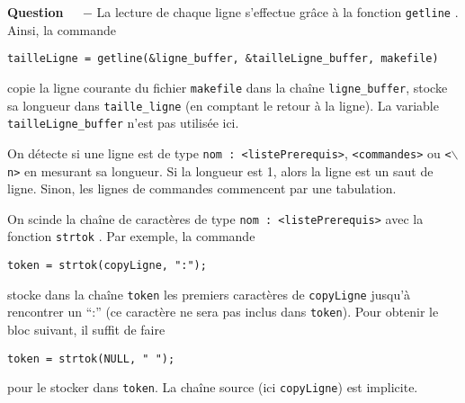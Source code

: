 \documentclass[11pt]{article}
\newcounter{question}[section]
\newenvironment{question}[1][]{\refstepcounter{question}\par\medskip
   \noindent\textbf{Question~\thequestion ~ $-$} \rmfamily}{}
\begin{document}
\begin{question}
La lecture de chaque ligne s'effectue grâce à la fonction \texttt{getline} \cite{getline}. Ainsi, la commande \begin{center}
\texttt{tailleLigne = getline(\&ligne\_buffer, \&tailleLigne\_buffer, makefile)}
\end{center}
copie la ligne courante du fichier \texttt{makefile} dans la chaîne \texttt{ligne\_buffer}, stocke sa longueur dans \texttt{taille\_ligne} (en comptant le retour à la ligne). La variable \texttt{tailleLigne\_buffer} n'est pas utilisée ici.


On détecte si une ligne est de type \texttt{nom : <listePrerequis>}, \texttt{<commandes>} ou \texttt{<$\backslash\!\!$ n>} en mesurant sa longueur. Si la longueur est 1, alors la ligne est un saut de ligne. Sinon, les lignes de commandes commencent par une tabulation.

On scinde la chaîne de caractères de type \texttt{nom : <listePrerequis>} avec la fonction \texttt{strtok} \cite{strtok}. Par exemple, la commande
\begin{center}
\texttt{token = strtok(copyLigne, ":");}
\end{center}
stocke dans la chaîne \texttt{token} les premiers caractères de \texttt{copyLigne} jusqu'à rencontrer un ``:'' (ce caractère ne sera pas inclus dans \texttt{token}). Pour obtenir le bloc suivant, il suffit de faire
\begin{center}
\texttt{token = strtok(NULL, " ");}
\end{center}
pour le stocker dans \texttt{token}. La chaîne source (ici \texttt{copyLigne}) est implicite.


\end{question}
\end{document}

